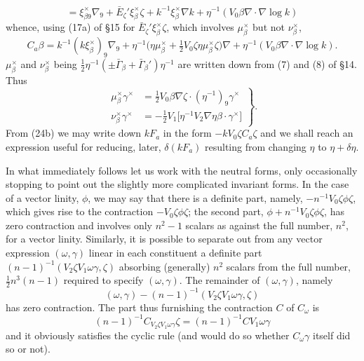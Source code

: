 \documentclass[11pt]{article}
\begin{document}
\[
=\xi_{\beta9}^\times\nabla_9+\bar E_\zeta'\xi_\beta^\times\zeta+k^{-1}\xi_\beta^\times\nabla k+\eta^{-1}(V_0\beta\nabla\mathbin{\cdot}\nabla\log k)
\]
whence, using (17a) of \S15 for $\bar E_\zeta'\xi_\beta^\times\zeta$, which involves $\mu_\beta^\times$ but not $\nu_\beta^\times$,
\begin{equation}C_a\beta=k^{-1}(k\xi_\beta^\times)_9\nabla_9+\eta^{-1}\bigl(\eta\mu_\beta^\times+\tfrac12V_0\zeta\eta\mu_\beta^\times\zeta\bigr)\nabla+\eta^{-1}(V_0\beta\nabla\mathbin{\cdot}\nabla\log k).\tag{24b}\end{equation}
$\mu_\beta^\times$ and $\nu_\beta^\times$ being $\tfrac12\eta^{-1}(\pm\bar\Gamma_\beta+\bar\Gamma_\beta')\eta^{-1}$ are written down from (7) and (8) of \S14. Thus
\begin{equation}
\left.\begin{aligned}
\mu_\beta^\times\gamma^\times&=\tfrac12V_0\beta\nabla\zeta\mathbin{\cdot}(\eta^{-1})_9\gamma^\times\\
\nu_\beta^\times\gamma^\times&=-\tfrac12V_1\bigl[\eta^{-1}V_2\nabla\eta\beta\mathbin{\cdot}\gamma^\times\bigr]
\end{aligned}\right\}.\tag{24c}
\end{equation}
From (24b) we may write down $kF_a$ in the form $-kV_0\zeta C_a\zeta$ and we shall reach an expression useful for reducing, later, $\delta(kF_a)$ resulting from changing $\eta$ to $\eta+\delta\eta$.

\indent In what immediately follows let us work with the neutral forms, only occasionally stopping to point out the slightly more complicated invariant forms. In the case of a vector linity, $\phi$, we may say that there is a definite part, namely, $-n^{-1}V_0\zeta\phi\zeta$, which gives rise to the contraction $-V_0\zeta\phi\zeta$; the second part, $\phi+n^{-1}V_0\zeta\phi\zeta$, has zero contraction and involves only $n^2-1$ scalars as against the full number, $n^2$, for a vector linity. Similarly, it is possible to separate out from any vector expression $(\omega,\gamma)$ linear in each constituent a definite part $(n-1)^{-1}(V_2\zeta V_1\omega\gamma,\zeta)$ absorbing (generally) $n^2$ scalars from the full number, $\tfrac12n^3(n-1)$ required to specify $(\omega,\gamma)$. The remainder of $(\omega,\gamma)$, namely
\[
(\omega,\gamma)-(n-1)^{-1}(V_2\zeta V_1\omega\gamma,\zeta)
\]
has zero contraction. The part thus furnishing the contraction $C$ of $C_\omega$ is
\[
(n-1)^{-1}C_{V_2\zeta V_1\omega\gamma}\zeta=(n-1)^{-1}CV_1\omega\gamma
\]
and it obviously satisfies the cyclic rule (and would do so whether $C_\omega\gamma$ itself did so or not).
\end{document}
